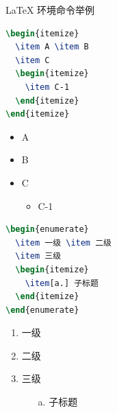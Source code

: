 \documentclass[aspectratio=169]{beamer}
\begin{document}
\begin{frame}[fragile]{\LaTeX{} 环境命令举例}
    \begin{minipage}{0.5\linewidth}
\begin{lstlisting}[language=TeX]
\begin{itemize}
  \item A \item B
  \item C
  \begin{itemize}
    \item C-1
  \end{itemize}
\end{itemize}
\end{lstlisting}
    \end{minipage}\hspace{1cm}
    \begin{minipage}{0.3\linewidth}
        \begin{itemize}
            \item A
            \item B
            \item C
            \begin{itemize}
                \item C-1
            \end{itemize}
        \end{itemize}
    \end{minipage}
    \medskip
    \pause
    \begin{minipage}{0.5\linewidth}
\begin{lstlisting}[language=TeX]
\begin{enumerate}
  \item 一级 \item 二级
  \item 三级
  \begin{itemize}
    \item[a.] 子标题
  \end{itemize}
\end{enumerate}
\end{lstlisting}
    \end{minipage}\hspace{1cm}
    \begin{minipage}{0.3\linewidth}
        \begin{enumerate}
            \item 一级
            \item 二级
            \item 三级
            \begin{itemize}
                \item[a.] 子标题
            \end{itemize}
        \end{enumerate}
    \end{minipage}
\end{frame}
\end{document}
